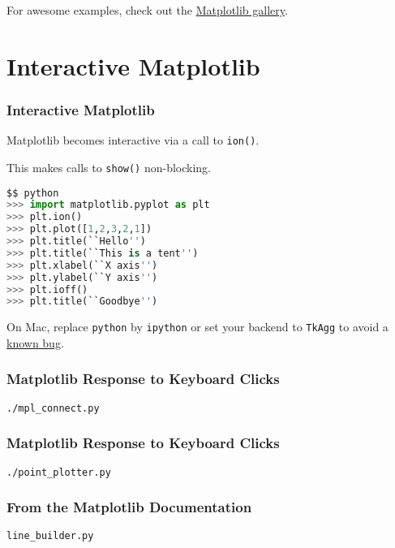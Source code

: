 \documentclass{beamer}
\begin{document}
\begin{frame}
For awesome examples, check out the \href{http://matplotlib.org/gallery.html}{Matplotlib gallery}.
\end{frame}

\section{Interactive Matplotlib}
\begin{frame}[fragile]
\frametitle{Interactive Matplotlib}

Matplotlib becomes interactive via a call to \texttt{ion()}.

This makes calls to \texttt{show()} non-blocking.
\begin{lstlisting}[language=Python]
$$ python
>>> import matplotlib.pyplot as plt
>>> plt.ion()
>>> plt.plot([1,2,3,2,1])
>>> plt.title(``Hello'')
>>> plt.title(``This is a tent'')
>>> plt.xlabel(``X axis'')
>>> plt.ylabel(``Y axis'')
>>> plt.ioff()
>>> plt.title(``Goodbye'')
\end{lstlisting}
On Mac, replace \texttt{python} by \texttt{ipython} or set your backend to \texttt{TkAgg} to avoid a \href{http://stackoverflow.com/questions/25960000/interactive-mode-doesnt-switch-on-from-script-matplotlib-1-4-0-python-2-7-5-on}{known bug}.
\end{frame}

\begin{frame}[fragile]
\frametitle{Matplotlib Response to Keyboard Clicks}
\texttt{./mpl\_connect.py}
\end{frame}

\begin{frame}[fragile]
\frametitle{Matplotlib Response to Keyboard Clicks}
\texttt{./point\_plotter.py}
\end{frame}

\begin{frame}[fragile]
\frametitle{From the Matplotlib Documentation}
\texttt{line\_builder.py}
\end{frame}
\end{document}
